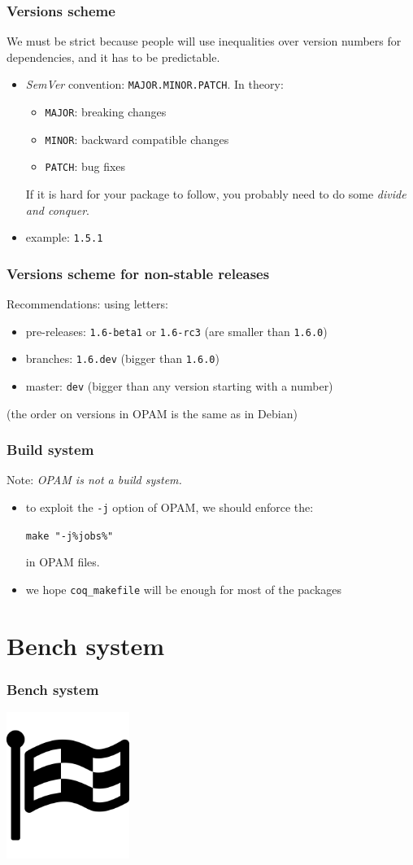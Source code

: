 \documentclass{beamer}
\begin{document}
  \begin{frame}
    \frametitle{Versions scheme}
    We must be strict because people will use inequalities over version numbers for dependencies, and it has to be predictable.
    \begin{itemize}
      \item \emph{SemVer} convention: \texttt{MAJOR.MINOR.PATCH}. In theory:
        \begin{itemize}
          \item \texttt{MAJOR}: breaking changes
          \item \texttt{MINOR}: backward compatible changes
          \item \texttt{PATCH}: bug fixes
        \end{itemize}
        If it is hard for your package to follow, you probably need to do some \emph{divide and conquer}.
      \item example: \texttt{1.5.1}
    \end{itemize}
  \end{frame}
  \begin{frame}
    \frametitle{Versions scheme for non-stable releases}
    Recommendations: using letters:
    \begin{itemize}
      \item pre-releases: \texttt{1.6-beta1} or \texttt{1.6-rc3} (are smaller than \texttt{1.6.0})
      \item branches: \texttt{1.6.dev} (bigger than \texttt{1.6.0})
      \item master: \texttt{dev} (bigger than any version starting with a number)
    \end{itemize}
    (the order on versions in OPAM is the same as in Debian)
  \end{frame}
  \begin{frame}
    \frametitle{Build system}
    Note: \emph{OPAM is not a build system.}
    \begin{itemize}
      \item to exploit the \texttt{-j} option of OPAM, we should enforce the:
        \begin{center}
          \texttt{make "-j\%{jobs}\%"}
        \end{center}
        in OPAM files.
      \item we hope \texttt{coq\_makefile} will be enough for most of the packages
    \end{itemize}
  \end{frame}

  \section{Bench system}
  \begin{frame}
    \frametitle{Bench system}
    \begin{center}
      \includegraphics[width=4cm]{images/bench}
    \end{center}
  \end{frame}
\end{document}

